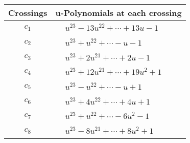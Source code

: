 \documentclass[1p]{elsarticle_modified}
\theoremstyle{definition}
\begin{document}
\begin{tabular}{m{50pt}|m{274pt}}
Crossings & \hspace{64pt}u-Polynomials at each crossing \\
\hline $$\begin{aligned}c_{1}\end{aligned}$$&$\begin{aligned}
&u^{23}-13 u^{22}+\cdots+13 u-1
\end{aligned}$\\
\hline $$\begin{aligned}c_{2}\end{aligned}$$&$\begin{aligned}
&u^{23}+u^{22}+\cdots- u-1
\end{aligned}$\\
\hline $$\begin{aligned}c_{3}\end{aligned}$$&$\begin{aligned}
&u^{23}+2 u^{21}+\cdots+2 u-1
\end{aligned}$\\
\hline $$\begin{aligned}c_{4}\end{aligned}$$&$\begin{aligned}
&u^{23}+12 u^{21}+\cdots+19 u^2+1
\end{aligned}$\\
\hline $$\begin{aligned}c_{5}\end{aligned}$$&$\begin{aligned}
&u^{23}- u^{22}+\cdots- u+1
\end{aligned}$\\
\hline $$\begin{aligned}c_{6}\end{aligned}$$&$\begin{aligned}
&u^{23}+4 u^{22}+\cdots+4 u+1
\end{aligned}$\\
\hline $$\begin{aligned}c_{7}\end{aligned}$$&$\begin{aligned}
&u^{23}+u^{22}+\cdots-6 u^2-1
\end{aligned}$\\
\hline $$\begin{aligned}c_{8}\end{aligned}$$&$\begin{aligned}
&u^{23}-8 u^{21}+\cdots+8 u^2+1
\end{aligned}$\\

\end{tabular}
\end{document}
